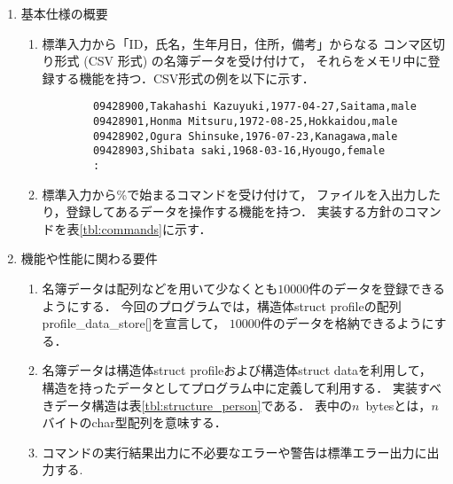 \documentclass[a4paper,11pt]{jarticle}
\begin{document}
\begin{enumerate}
\setlength{\parskip}{0mm}\setlength{\itemsep}{0mm}%
\item 基本仕様の概要
    \begin{enumerate}
    \item 標準入力から「ID，氏名，生年月日，住所，備考」からなる
          コンマ区切り形式 (CSV 形式) の名簿データを受け付けて，
          それらをメモリ中に登録する機能を持つ．CSV形式の例を以下に示す．

    {\fontsize{10pt}{11pt} \selectfont
        \begin{verbatim}
        09428900,Takahashi Kazuyuki,1977-04-27,Saitama,male
        09428901,Honma Mitsuru,1972-08-25,Hokkaidou,male
        09428902,Ogura Shinsuke,1976-07-23,Kanagawa,male
        09428903,Shibata saki,1968-03-16,Hyougo,female
        :
        \end{verbatim}
    }
    \item 標準入力から\%で始まるコマンドを受け付けて，
          ファイルを入出力したり，登録してあるデータを操作する機能を持つ．
          実装する方針のコマンドを表\ref{tbl:commands}に示す．
    \end{enumerate}
\item 機能や性能に関わる要件
    \begin{enumerate}
    \item 名簿データは配列などを用いて少なくとも$10000$件のデータを登録できるようにする．
          今回のプログラムでは，構造体struct profileの配列profile\_data\_store[]を宣言して，
          $10000$件のデータを格納できるようにする．
    \item 名簿データは構造体struct profileおよび構造体struct dataを利用して，
          構造を持ったデータとしてプログラム中に定義して利用する．
          実装すべきデータ構造は表\ref{tbl:structure_person}である．
          表中の$n$~bytesとは，$n$バイトのchar型配列を意味する．
    \item コマンドの実行結果出力に不必要なエラーや警告は標準エラー出力に出力する.
    \end{enumerate}
\end{enumerate}
\end{document}
